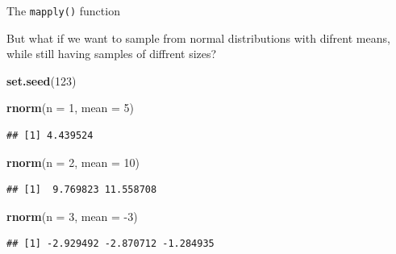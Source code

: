 \documentclass[ignorenonframetext,]{beamer}
\newenvironment{Shaded}{\begin{snugshade}}{\end{snugshade}}
\newcommand{\DataTypeTok}[1]{\textcolor[rgb]{0.13,0.29,0.53}{#1}}
\newcommand{\DecValTok}[1]{\textcolor[rgb]{0.00,0.00,0.81}{#1}}
\newcommand{\KeywordTok}[1]{\textcolor[rgb]{0.13,0.29,0.53}{\textbf{#1}}}
\newcommand{\NormalTok}[1]{#1}
\begin{document}
\begin{frame}[fragile]{The \texttt{mapply()} function}
\protect\hypertarget{the-mapply-function-4}{}

But what if we want to sample from normal distributions with difrent
means, while still having samples of diffrent sizes?

\begin{Shaded}
\begin{Highlighting}[]
\KeywordTok{set.seed}\NormalTok{(}\DecValTok{123}\NormalTok{)}

\KeywordTok{rnorm}\NormalTok{(}\DataTypeTok{n =} \DecValTok{1}\NormalTok{, }\DataTypeTok{mean =} \DecValTok{5}\NormalTok{)}
\end{Highlighting}
\end{Shaded}

\begin{verbatim}
## [1] 4.439524
\end{verbatim}

\begin{Shaded}
\begin{Highlighting}[]
\KeywordTok{rnorm}\NormalTok{(}\DataTypeTok{n =} \DecValTok{2}\NormalTok{, }\DataTypeTok{mean =} \DecValTok{10}\NormalTok{)}
\end{Highlighting}
\end{Shaded}

\begin{verbatim}
## [1]  9.769823 11.558708
\end{verbatim}

\begin{Shaded}
\begin{Highlighting}[]
\KeywordTok{rnorm}\NormalTok{(}\DataTypeTok{n =} \DecValTok{3}\NormalTok{, }\DataTypeTok{mean =} \DecValTok{-3}\NormalTok{)}
\end{Highlighting}
\end{Shaded}

\begin{verbatim}
## [1] -2.929492 -2.870712 -1.284935
\end{verbatim}

\end{frame}
\end{document}
